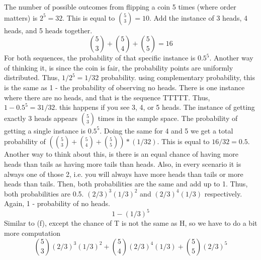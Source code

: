 \documentclass[11pt]{article}
\begin{document}
\begin{solution}\begin{Parts}
\Part The number of possible outcomes from flipping a coin 5 times (where order matters) is $2^5=32$.
\Part This is equal to $\binom{5}{3}=10$.
\Part Add the instance of 3 heads, 4 heads, and 5 heads together.
$$\binom{5}{3}+\binom{5}{4}+\binom{5}{5} = 16$$
\Part For both sequences, the probability of that specific instance is $0.5^5$.
Another way of thinking it, is since the coin is fair, the probability points are uniformly distributed.
Thus, $1/2^5 = 1/32$ probability.
\Part using complementary probability, this is the same as 1 - the probability of observing no heads.
There is one instance where there are no heads, and that is the sequence TTTTT.
Thus, $1-0.5^5 = 31/32$. 
\Part this happens if you see 3, 4, or 5 heads.
The instance of getting exactly 3 heads appears $\binom{5}{3}$ times in the sample space.
The probability of getting a single instance is $0.5^5$. 
Doing the same for 4 and 5 we get a total probability of
$(\binom{5}{3}+\binom{5}{4}+\binom{5}{5})*(1/32)$.
This is equal to $16/32=0.5$. Another way to think about this, is there is an equal chance of 
having more heads than tails as having more tails than heads. 
Also, in every scenario it is always one of those 2, i.e. you will always have more heads than tails or more heads than tails.
Then, both probabilities are the same and add up to 1. Thus, both probabilities are 0.5.
\Part $(2/3)^3(1/3)^2$ and $(2/3)^4(1/3)$ respectively.
\Part Again, 1 - probability of no heads. 
$$1-(1/3)^5$$
\Part 
Similar to (f), except the chance of T is not the same as H, so we have to do a bit more computation
$$\binom{5}{3}(2/3)^3(1/3)^2+\binom{5}{4}(2/3)^4(1/3)+\binom{5}{5}(2/3)^5$$
\end{Parts}\end{solution}
\end{document}
